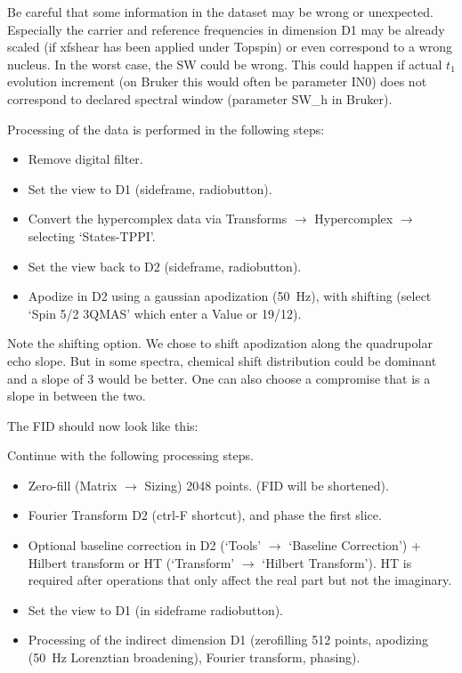 \documentclass[11pt,a4paper]{article}
\begin{document}
Be careful that some information in the dataset may be wrong or unexpected. Especially the carrier and reference frequencies
in dimension D1 may be already scaled (if xfshear has been applied under Topspin) or even correspond to a wrong nucleus. 
In the worst case, the SW could be wrong. This could happen if actual $t_1$ evolution increment (on Bruker this would often 
be parameter IN0) does not correspond to declared spectral window (parameter SW\_h in Bruker).

Processing of the data is performed in the following steps:
\begin{itemize}
  \item Remove digital filter.
  \item Set the view to D1 (sideframe, radiobutton).
  \item Convert the hypercomplex data via Transforms  $\longrightarrow$ Hypercomplex  $\longrightarrow$
   selecting `States-TPPI'.
  \item Set the view back to D2 (sideframe, radiobutton).
  \item Apodize in D2 using a gaussian apodization (50~Hz), with shifting (select `Spin 5/2 3QMAS' which enter a Value or 19/12).
\end{itemize}

Note the shifting option. We chose to shift apodization along the quadrupolar echo slope. But in some spectra, chemical shift 
distribution could be dominant and a slope of 3 would be better. One can also choose a compromise that is a slope in between
the two.

The FID should now look like this:
\begin{center}
\end{center}

Continue with the following processing steps.
\begin{itemize}
  \item Zero-fill (Matrix $\longrightarrow$  Sizing) 2048 points. (FID will be shortened).
  \item Fourier Transform D2 (ctrl-F shortcut), and phase the first slice.
  \item Optional baseline correction in D2 (`Tools' $\longrightarrow$ `Baseline Correction') + Hilbert transform or HT
      (`Transform' $\longrightarrow$ `Hilbert Transform'). HT is required after operations that only affect the real part
       but not the imaginary.
  \item Set the view to D1 (in sideframe radiobutton).
  \item Processing of the indirect dimension D1 (zerofilling 512 points, apodizing (50~Hz Lorenztian broadening), Fourier transform, phasing).
\end{itemize}
\end{document}
